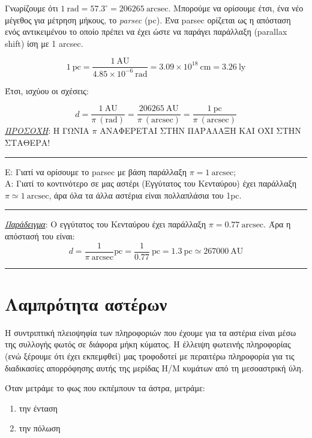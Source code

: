 Γνωρίζουμε ότι $1 \ \text{rad} = 57.3^{\circ} = 206265 \ \text{arcsec}$. Μπορούμε να ορίσουμε έτσι, ένα νέο μέγεθος για μέτρηση μήκους, το \textit{parsec} (pc). Ένα parsec ορίζεται ως η απόσταση ενός αντικειμένου το οποίο πρέπει να έχει ώστε να παράγει παράλλαξη (parallax shift) ίση με 1 arcsec.

\begin{equation}
    1 \ \text{pc} = \frac{1 \ \text{AU}}{4.85 \times 10^{-6} \ \text{rad}} = 3.09 \times 10^{18} \ \text{cm} = 3.26 \ \text{ly}
\end{equation}

Έτσι, ισχύου οι σχέσεις:

\begin{equation}
    d = \frac{1 \ \text{AU}}{\pi \ (\text{rad})} = \frac{206265 \ \text{AU}}{\pi \ (\text{arcsec})} = \frac{1 \ \text{pc}}{\pi \ (\text{arcsec})}
\end{equation}
\textit{\underline{ΠΡΟΣΟΧΗ}}: Η ΓΩΝΙΑ $\pi$ ΑΝΑΦΕΡΕΤΑΙ ΣΤΗΝ ΠΑΡΑΛΑΞΗ ΚΑΙ ΟΧΙ ΣΤΗΝ ΣΤΑΘΕΡΑ!
\\
{\color{red} \hrule }
E: Γιατί να ορίσουμε το parsec με βάση παράλλαξη $\pi = 1 \ \text{arcsec}$;\\
Α: Γιατί το κοντινότερο σε μας αστέρι (Εγγύτατος του Κενταύρου) έχει παράλλαξη $\pi \simeq 1 \ \text{arcsec}$, άρα όλα τα άλλα αστέρια είναι πολλαπλάσια του 1pc.
{\color{red} \hrule }

\textit{\underline{Παράδειγμα}}: Ο εγγύτατος του Κενταύρου έχει παράλλαξη $ \pi = 0.77 \ \text{arcsec}$. Άρα η απόστασή του είναι:
\begin{equation*}
    d = \frac{1}{\pi \ \text{arcsec}} \text{pc} = \frac{1}{0.77} \ \text{pc} = 1.3 \ \text{pc} \simeq 267000 \ \text{AU}
\end{equation*}
\hrule



\section{Λαμπρότητα αστέρων}

Η συντριπτική πλειοψηφία των πληροφοριών που έχουμε για τα αστέρια είναι μέσω της συλλογής φωτός σε διάφορα μήκη κύματος. Η έλλειψη φωτεινής πληροφορίας (ενώ ξέρουμε ότι έχει εκπεμφθεί) μας τροφοδοτεί με περαιτέρω πληροφορία για τις διαδικασίες απορρόφησης αυτής της μερίδας Η/Μ κυμάτων από τη μεσοαστρική ύλη.

Όταν μετράμε το φως που εκπέμπουν τα άστρα, μετράμε:
\begin{enumerate}
    \item την ένταση
    \item την πόλωση
\end{enumerate}

